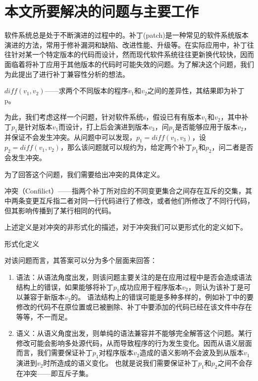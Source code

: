 \section{本文所要解决的问题与主要工作}

软件系统总是处于不断演进的过程中的。补丁(patch)是一种常见的软件系统版本演进的方法，常用于修补漏洞和缺陷、改进性能、升级等。在实际应用中，补丁往往针对某一个特定版本的代码而设计，然而现代软件系统往往更新换代较快，因而面临着将补丁应用于其他版本的代码时可能失效的问题。为了解决这个问题，我们为此提出了进行补丁兼容性分析的想法。

\begin{definition}
	$diff(v_1,v_2)$——求两个不同版本的程序$v_1$和$v_2$之间的差异性，其结果即为补丁p。
\end{definition}

为此，我们考虑这样一个问题，针对软件系统s，假设已有有版本$v_1$和$v_2$，其中补丁$p_1$是针对版本$v_1$而设计，打上后会演进到版本$v_3$，问$p_1$是否能够应用于版本$v_{2}$，并保证不会发生冲突。从问题中可以发现，$p_{1} = diff(v_{1},v_{3})$，设$p_{2} = diff(v_{1},v_{2})$，那么该问题就可以规约为，给定两个补丁$p_1$和$p_2$，问二者是否会发生冲突。

为了回答这个问题，我们需要给出冲突的具体定义。

\begin{definition}
	冲突（Confilict）——指两个补丁所对应的不同变更集合之间存在互斥的交集，其中两条变更互斥指二者对同一行代码进行了修改，或者他们所修改了不同行代码，但其影响传播到了某行相同的代码。
\end{definition}

上述定义是对冲突的非形式化的描述，对于冲突我们可以更形式化的定义如下。

\begin{definition}
	形式化定义
\end{definition}

对该问题而言，其答案可以分为多个层面来回答：

\begin{enumerate}
	\item
	语法：从语法角度出发，则该问题主要关注的是在应用过程中是否会造成语法结构上的错误，如果能够将补丁$p_1$成功应用于程序版本$v_2$，则认为该补丁是可以兼容于新版本$v_2$的。
	语法结构上的错误可能是多种多样的，例如补丁中的要修改的代码不在原位置或已被删除、补丁中要添加的代码已经在该文件中存在等等，不一而足。
	\item
	语义：从语义角度出发，则单纯的语法兼容并不能够完全解答这个问题。某行修改可能会影响多处源代码，从而导致程序的行为发生变化。因而从语义层面而言，我们需要保证补丁$p_1$对程序版本$v_2$造成的语义影响不会波及到从版本$v_1$演进到$v_2$时所造成的语义变化。
	也就是说我们需要保证补丁$p_1$和$p_2$之间不会存在冲突——即互斥子集。
\end{enumerate}

